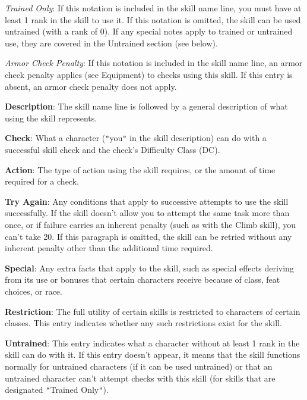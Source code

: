 \textit{Trained Only}: If this notation is included in the skill name line, you must have at least 1 rank in the skill to use it. If this notation is omitted, the skill can be used untrained (with a rank of 0). If any special notes apply to trained or untrained use, they are covered in the Untrained section (see below).\newline
				
\textit{Armor Check Penalty}: If this notation is included in the skill name line, an armor check penalty applies (see Equipment) to checks using this skill. If this entry is absent, an armor check penalty does not apply.
				
\textbf{Description}: The skill name line is followed by a general description of what using the skill represents.
				
\textbf{Check}: What a character (\texttt{{}"{}}you\texttt{{}"{}} in the skill description) can do with a successful skill check and the check's Difficulty Class (DC).
				
\textbf{Action}: The type of action using the skill requires, or the amount of time required for a check.
				
\textbf{Try Again}: Any conditions that apply to successive attempts to use the skill successfully. If the skill doesn't allow you to attempt the same task more than once, or if failure carries an inherent penalty (such as with the Climb skill), you can't take 20. If this paragraph is omitted, the skill can be retried without any inherent penalty other than the additional time required.
				
\textbf{Special}: Any extra facts that apply to the skill, such as special effects deriving from its use or bonuses that certain characters receive because of class, feat choices, or race.
				
\textbf{Restriction}: The full utility of certain skills is restricted to characters of certain classes. This entry indicates whether any such restrictions exist for the skill.
				
\textbf{Untrained}: This entry indicates what a character without at least 1 rank in the skill can do with it. If this entry doesn't appear, it means that the skill functions normally for untrained characters (if it can be used untrained) or that an untrained character can't attempt checks with this skill (for skills that are designated \texttt{{}"{}}Trained Only\texttt{{}"{}}).
        	


























